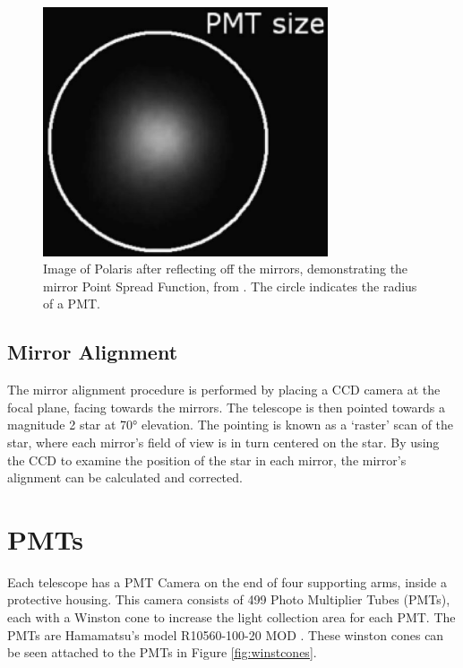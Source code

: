 \begin{figure}[ht]
  \centering
  \includegraphics[width=0.75\textwidth]{images/mirror_polaris.eps}
  \caption[Polaris PSF]{
    Image of Polaris after reflecting off the mirrors, demonstrating the mirror Point Spread Function, from \cite{Veritas_Detector}.
    The circle indicates the radius of a PMT.}
  \label{fig:mirrorpolaris}
\end{figure}



\subsection{Mirror Alignment}
The mirror alignment procedure is performed by placing a CCD camera at the focal plane, facing towards the mirrors.
The telescope is then pointed towards a magnitude 2 star at \nicetilde{}\ang{70} elevation.
The pointing is known as a `raster' scan of the star, where each mirror's field of view is in turn centered on the star.
By using the CCD to examine the position of the star in each mirror, the mirror's alignment can be calculated and corrected.



\section{PMTs}\label{sec:pmts}

Each telescope has a PMT Camera on the end of four supporting arms, inside a protective housing.
This camera consists of 499 Photo Multiplier Tubes (PMTs), each with a Winston cone to increase the light collection area for each PMT.
The PMTs are Hamamatsu's model R10560-100-20 MOD \cite{pmtmodels}.
These winston cones can be seen attached to the PMTs in Figure \ref{fig:winstcones}.

